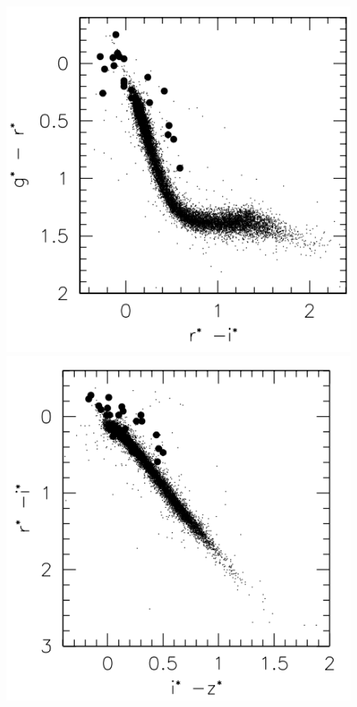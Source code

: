 \begin{figure}[!ht]
	\centering
	\includegraphics[scale=0.4]{Muestra/Secciones/Figures/gr-ri_Szkody2002.png}
	\includegraphics[scale=0.4]{Muestra/Secciones/Figures/ri-iz_Szkody2002.png}

\end{figure}
